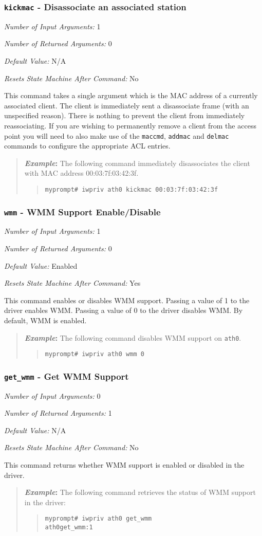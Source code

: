 \documentclass[10pt,fullpage]{article}
\newcommand{\mytt}[1]{{\texttt{#1}}}
\newcommand{\bv}{\begin{verse}}
\newcommand{\ev}{\end{verse}}
\newcommand{\cmd}[1]{{\texttt{myprompt\# #1}}}
\newcommand{\argdesc}[4]{\begin{description}
\itemsep -6pt
\item \textit{Number of Input Arguments:} #1
\item \textit{Number of Returned Arguments:} #2
\item \textit{Default Value:} #3
\item \textit{Resets State Machine After Command:} #4
\end{description}
}
\newenvironment{example}{\begin{quote}\textbf{\textit{Example}:}}{\end{quote}}
\begin{document}
\subsubsection{\mytt{kickmac} - Disassociate an associated station}
\argdesc{1}{0}{N/A}{No}
This command takes a single argument which is the MAC address of a 
currently associated client. The client is immediately sent a disassociate
frame (with an unspecified reason). There is nothing to prevent the
client from immediately reassociating. If you are wishing to permanently
remove a client from the access point you will need to also make use of the 
\mytt{maccmd}, \mytt{addmac} and \mytt{delmac} commands to configure the 
appropriate ACL entries.
\begin{example}
  The following command immediately disassociates the client with MAC
  address 00:03:7f:03:42:3f.
  \bv
  \cmd{iwpriv ath0 kickmac 00:03:7f:03:42:3f}
  \ev
\end{example}

\subsubsection{\mytt{wmm} - WMM Support Enable/Disable}
\argdesc{1}{0}{Enabled}{Yes}
This command enables or disables WMM support. Passing a value of 1 to
the driver enables WMM. Passing a value of 0 to the driver disables
WMM.  By default, WMM is enabled.
\begin{example}
  The following command disables WMM support on \mytt{ath0}.
  \bv
  \cmd{iwpriv ath0 wmm 0}
  \ev
\end{example}

\subsubsection{\mytt{get\_wmm} - Get WMM Support}
\argdesc{0}{1}{N/A}{No}
This command returns whether WMM support is enabled or disabled in the
driver.
\begin{example}
  The following command retrieves the status of WMM support in the
  driver:
  \bv
  \cmd{iwpriv ath0 get\_wmm}\\
  \mytt{ath0\hspace{32pt}get\_wmm:1}
  \ev
\end{example}
\end{document}
